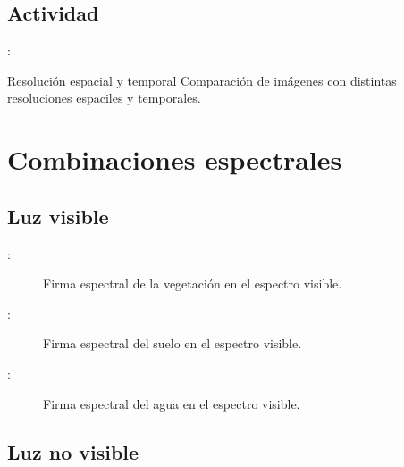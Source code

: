 \documentclass[]{beamer}
\begin{document}
\subsection{Actividad}

\begin{frame}{\secname : \subsecname}
    \begin{alertblock}{Resolución espacial y temporal}
        Comparación de imágenes con distintas resoluciones espaciles y temporales.
    \end{alertblock}
\end{frame}


\section{Combinaciones espectrales}
\subsection{Luz visible}

\begin{frame}{\secname : \subsecname}
    \begin{figure}[h!]
        \centering
        \caption{Firma espectral de la vegetación en el espectro visible.}
        \label{}
    \end{figure}
\end{frame}

\begin{frame}{\secname : \subsecname}
    \begin{figure}[h!]
        \centering
        \caption{Firma espectral del suelo en el espectro visible.}
        \label{}
    \end{figure}
\end{frame}

\begin{frame}{\secname : \subsecname}
    \begin{figure}[h!]
        \centering
        \caption{Firma espectral del agua en el espectro visible.}
        \label{}
    \end{figure}
\end{frame}

\subsection{Luz no visible}
\end{document}
